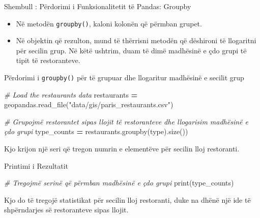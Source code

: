 \documentclass[
  ignorenonframetext,
]{beamer}
\newenvironment{Shaded}{\begin{snugshade}}{\end{snugshade}}
\newcommand{\BuiltInTok}[1]{#1}
\newcommand{\CommentTok}[1]{\textcolor[rgb]{0.56,0.35,0.01}{\textit{#1}}}
\newcommand{\NormalTok}[1]{#1}
\newcommand{\OperatorTok}[1]{\textcolor[rgb]{0.81,0.36,0.00}{\textbf{#1}}}
\newcommand{\StringTok}[1]{\textcolor[rgb]{0.31,0.60,0.02}{#1}}
\begin{document}
\begin{frame}[fragile]{Shembull : Përdorimi i Funksionalitetit të
Pandas: Groupby}
\protect\hypertarget{shembull-puxebrdorimi-i-funksionalitetit-tuxeb-pandas-groupby-1}{}
\begin{itemize}
\item
  Në metodën \texttt{groupby()}, kaloni kolonën që përmban grupet.
\item
  Në objektin që rezulton, mund të thërrisni metodën që dëshironi të
  llogaritni për secilin grup. Në këtë ushtrim, duam të dimë madhësinë e
  çdo grupi të tipit të restoranteve.
\end{itemize}
\end{frame}

\begin{frame}[fragile]{Përdorimi i \texttt{groupby()} për të grupuar dhe
llogaritur madhësinë e secilit grup}
\protect\hypertarget{puxebrdorimi-i-groupby-puxebr-tuxeb-grupuar-dhe-llogaritur-madhuxebsinuxeb-e-secilit-grup}{}

\begin{Shaded}
\begin{Highlighting}[]
\CommentTok{\# Load the restaurants data}
\NormalTok{restaurants }\OperatorTok{=}\NormalTok{ geopandas.read\_file(}\StringTok{"data/gis/paris\_restaurants.csv"}\NormalTok{)}

\CommentTok{\# Grupojmë restorantet sipas llojit të restoranteve dhe llogarisim madhësinë e çdo grupi}
\NormalTok{type\_counts }\OperatorTok{=}\NormalTok{ restaurants.groupby(}\StringTok{\textquotesingle{}type\textquotesingle{}}\NormalTok{).size())}
\end{Highlighting}
\end{Shaded}

Kjo krijon një seri që tregon numrin e elementëve për secilin lloj
restoranti.
\end{frame}

\begin{frame}[fragile]{Printimi i Rezultatit}
\protect\hypertarget{printimi-i-rezultatit}{}

\begin{Shaded}
\begin{Highlighting}[]
\CommentTok{\# Tregojmë serinë që përmban madhësinë e çdo grupi}
\BuiltInTok{print}\NormalTok{(type\_counts)}
\end{Highlighting}
\end{Shaded}

Kjo do të tregojë statistikat për secilin lloj restoranti, duke na dhënë
një ide të shpërndarjes së restoranteve sipas llojit.
\end{frame}
\end{document}
